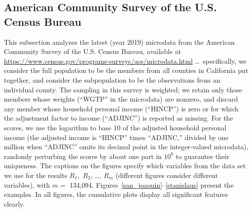 \documentclass{article}
\begin{document}
\subsection{American Community Survey of the U.S. Census Bureau}
\label{census}

This subsection analyzes the latest (year 2019) microdata
from the American Community Survey of the U.S. Census Bureau,
available at \url{https://www.census.gov/programs-surveys/acs/microdata.html}
\dots\ specifically, we consider the full population to be the members
from all counties in California put together, and consider the subpopulation
to be the observations from an individual county.
The sampling in this survey is weighted;
we retain only those members whose weights (``WGTP'' in the microdata)
are nonzero, and discard any member whose household personal income
(``HINCP'') is zero or for which the adjustment factor to income (``ADJINC'')
is reported as missing.
For the scores, we use the logarithm to base 10
of the adjusted household personal income
(the adjusted income is ``HINCP'' times ``ADJINC,'' divided by one million
when ``ADJINC'' omits its decimal point in the integer-valued microdata),
randomly perturbing the scores by about one part in $10^8$ to guarantee
their uniqueness.
The captions on the figures specify which variables from the data set
we use for the results $R_1$,~$R_2$, \dots, $R_m$
(different figures consider different variables), with $m =$ 134,094.
Figures~\ref{san_joaquin}--\ref{stanislaus} present the examples.
In all figures, the cumulative plots display all significant features clearly.
\end{document}
